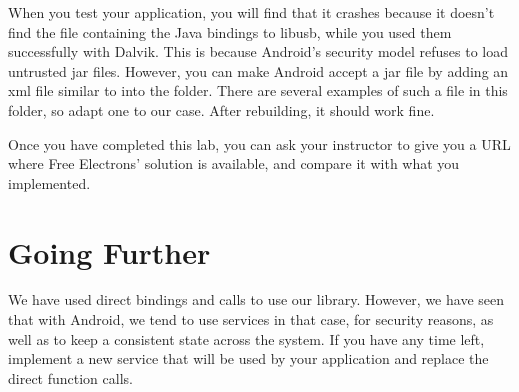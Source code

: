 When you test your application, you will find that it
crashes because it doesn't find the  file containing the Java
bindings to libusb, while you used them successfully with
Dalvik. This is because Android's security model refuses to load
untrusted jar files. However, you can make Android accept a jar file
by adding an xml file similar to  into
the  folder. There are several examples
of such a file in this folder, so adapt one to our case. After
rebuilding, it should work fine.

Once you have completed this lab, you can ask your instructor to
give you a URL where Free Electrons' solution is available, and compare
it with what you implemented.

\section{Going Further}

We have used direct bindings and calls to use our library. However, we
have seen that with Android, we tend to use services in that case, for
security reasons, as well as to keep a consistent state across the
system. If you have any time left, implement a new service that will
be used by your application and replace the direct function calls.
